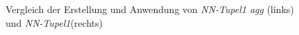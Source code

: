 \documentclass[
	12pt,
	a4paper,
	BCOR10mm,
	DIV14,
	listof=totoc,
	bibliography=totoc,
	headsepline
]{scrreprt}
\begin{document}
	\begin{figure}
		\centering
		\caption{Vergleich der Erstellung und Anwendung von \textit{NN-Tupel1 agg} (links) und \textit{NN-Tupel1}(rechts)}
		\label{fig:tupel1vstupel1agg}
	\end{figure} 
\end{document}

